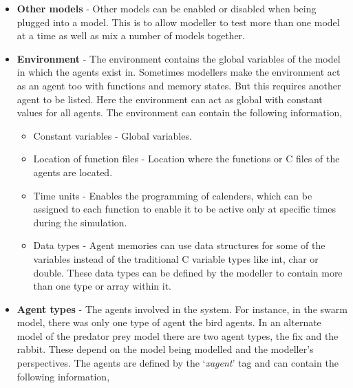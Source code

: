 \begin{itemize}
\item \textbf{Other models} - Other models can be enabled or disabled when being plugged into a model. This is to allow modeller to test more than one model at a time as well as mix a number of models together.
\item \textbf{Environment} - The environment contains the global variables of the model in which the agents exist in. Sometimes modellers make the environment act as an agent too with functions and memory states. But this requires another agent to be listed. Here the environment can act as global with constant values for all
agents. The environment can contain the following information,
\begin{itemize}
\item Constant variables - Global variables.
\item Location of function files - Location where the functions or C files of the agents are located.
\item Time units - Enables the programming of calenders, which can be assigned to each function to enable it to be active only at specific times during the simulation.
\item Data types - Agent memories can use data structures for some of the variables instead of the traditional C variable types like int, char or double. These data types can be defined by the modeller to contain more than one type or array within it.
\end{itemize}
\item \textbf{Agent types} - The agents involved in the system. For instance, in the swarm model, there was only one type of agent the bird agents. In an alternate model of the predator prey model there are two agent types, the fix and the rabbit. These depend on the model being modelled and the modeller's
perspectives. The agents are defined by the `\emph{xagent}' tag and
can contain the following information,
\begin{itemize}

\end{itemize}
\end{itemize}
